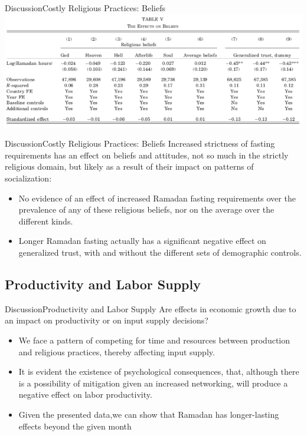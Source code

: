 \documentclass[pdftex,12pt,xcolor=pdftex,table]{beamer}
\begin{document}
    \begin{frame}{Discussion}{Costly Religious Practices: Beliefs}
    \vspace{-0.5cm}
    \centering\includegraphics[scale=0.43]{tab5.png}
    \end{frame}  


    \begin{frame}{Discussion}{Costly Religious Practices: Beliefs}
    Increased strictness of fasting requirements has an effect on beliefs and attitudes, not so much in the strictly religious domain, but likely as a result of their impact on patterns of socialization: 
    \begin{itemize}
        \item<2-> No evidence of an effect of increased Ramadan fasting requirements over the prevalence of any of these religious beliefs, nor on the average over the different kinds.
        \item<3-> Longer Ramadan fasting actually has a significant negative effect on generalized trust, with and without the different sets of demographic controls. 
        
      \end{itemize}
    \end{frame}

\subsection{Productivity and Labor Supply}
    \begin{frame}{Discussion}{Productivity and Labor Supply}
    Are effects in economic growth due to an impact on productivity or on input supply decisions?
    \begin{itemize}
        \item<2-> We face a pattern of competing for time and resources between production and religious practices, thereby affecting input supply.
        \item<3-> It is evident the existence of psychological consequences, that, although there is a possibility of mitigation given an increased networking, will produce a negative effect on labor productivity.
        \item<4-> Given the presented data,we can show that Ramadan has longer-lasting effects beyond the given month
    \end{itemize}
    \end{frame}
    
\end{document}
